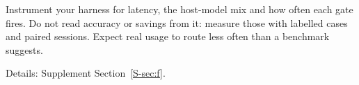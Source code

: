 \begin{keyidea}[title={For practitioners}]
Instrument your harness for latency, the host-model mix and how often each gate fires. Do not read accuracy or
savings from it: measure those with labelled cases and paired sessions. Expect real usage to route less often than a
benchmark suggests.
\end{keyidea}

Details: Supplement Section~\ref{S-sec:f}.
